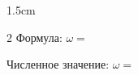 
\begin{answerboxpart}{1.5cm}
\begin{multicols}{2}
    Формула: \(\omega=\)

    \columnbreak

    Численное значение: \(\omega=\)
\end{multicols}
\end{answerboxpart}
